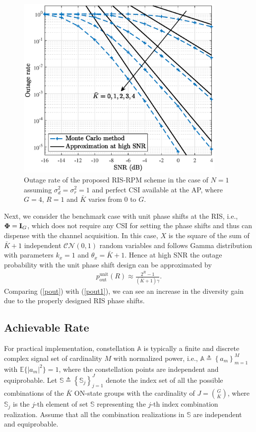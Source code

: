 \documentclass[draftclsnofoot,onecolumn,12pt]{IEEEtran}
\begin{document}
\begin{figure}[!t]
	\centering
	\includegraphics[width=4in]{G4_R1_Pout.eps}
	\caption{Outage rate of the proposed RIS-RPM scheme in the case of $N=1$ assuming $\sigma_d^2=\sigma_r^2=1$ and perfect CSI available at the AP, where $G=4$, $R=1$ and $\bar{K}$ varies from $0$ to $G$.}
	\label{outage}
\end{figure}

Next, we consider the benchmark case with unit phase shifts at the RIS, i.e., ${\bm \Phi}={\bf I}_G$, which does not require
any CSI for setting the phase shifts and thus can dispense with the channel acquisition. 
In this case, 
$X$ is the square of the sum of $\bar{K}+1$ independent
$\mathcal{CN}(0,1)$ random variables and follows Gamma distribution with parameters $k_x=1$ and $\theta_x=\bar{K}+1$. 
Hence at high SNR the outage probability with the unit phase shift design can be approximated by  
\begin{align}\label{pout1}
p_\text{out}^\text{unit} (R) \approx \frac{2^R -1}{ (\bar{K} +1)\gamma} . 
\end{align}
Comparing (\ref{pout}) with (\ref{pout1}), we can see an increase in the diversity gain due to the properly designed RIS phase shifts. 




\subsection{Achievable Rate}
For practical implementation, constellation $\mathbb{A}$ is typically a finite and discrete complex signal set of cardinality $M$ with normalized power, i.e., $\mathbb{A}\triangleq \left\{ a_m \right\}_{m=1}^M$ with $\mathbb{E}\{|a_m|^2\}=1$, where the constellation points are independent and equiprobable. 
Let $\mathbb{S}\triangleq \left\{ {\mathbb{S}_j} \right\}_{j=1}^J$ denote the index set of all the possible combinations of the $\bar{K}$ ON-state groups with the cardinality of $J={G\choose{\bar K}}$, where $\mathbb{S}_j$ is the $j\text{-th}$ element of set $\mathbb{S}$ representing the $j$-th index combination realization. 
Assume that all the combination realizations in $\mathbb{S}$ are independent and equiprobable. 
\end{document}
